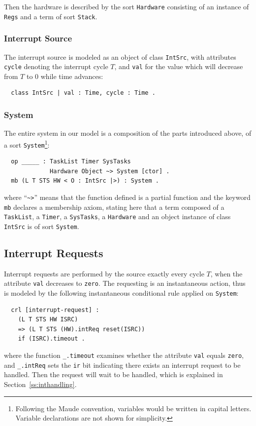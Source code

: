 \documentclass[12pt,onecolumn]{IEEEtranTIE}
\begin{document}
Then the hardware is described by the sort \verb|Hardware| consisting
of an instance of \verb|Regs| and a term of sort \verb|Stack|.  

\subsubsection{Interrupt Source}
The interrupt source is modeled as an object of class \verb|IntSrc|,
with attributes \verb|cycle| denoting the interrupt cycle $T$, and
\verb|val| for the value which will decrease from $T$ to $0$ while
time advances:
\begin{verbatim}
  class IntSrc | val : Time, cycle : Time .
\end{verbatim}

\subsubsection{System}
The entire system in our model is a composition of the parts
introduced above, of a sort \verb|System|\footnote{Following the Maude
  convention, variables would be written in capital letters. Variable
  declarations are not shown for simplicity.}:
\begin{verbatim}
  op _____ : TaskList Timer SysTasks 
             Hardware Object ~> System [ctor] .
  mb (L T STS HW < O : IntSrc |>) : System .
\end{verbatim}
where ``\verb|~>|'' means that the function defined is a partial
function and the keyword \verb|mb| declares a membership axiom,
stating here that a term composed of a \verb|TaskList|, a
\verb|Timer|, a \verb|SysTasks|, a \verb|Hardware| and an object
instance of class \verb|IntSrc| is of sort \verb|System|.

\subsection{Interrupt Requests}
\label{ss:ir}
Interrupt requests are performed by the source exactly every cycle
$T$, when the attribute \verb|val| decreases to \verb|zero|. The
requesting is an instantaneous action, thus is modeled by the
following instantaneous conditional rule applied on \verb|System|:
\begin{verbatim}
  crl [interrupt-request] :
    (L T STS HW ISRC) 
    => (L T STS (HW).intReq reset(ISRC))
    if (ISRC).timeout .
\end{verbatim}
where the function \verb|_.timeout| examines whether the attribute
\verb|val| equals \verb|zero|, and \verb|_.intReq| sets the \verb|ir|
bit indicating there exists an interrupt request to be handled.
Then the request will wait to be handled, which is explained in
Section~\ref{ss:inthandling}.
\end{document}
